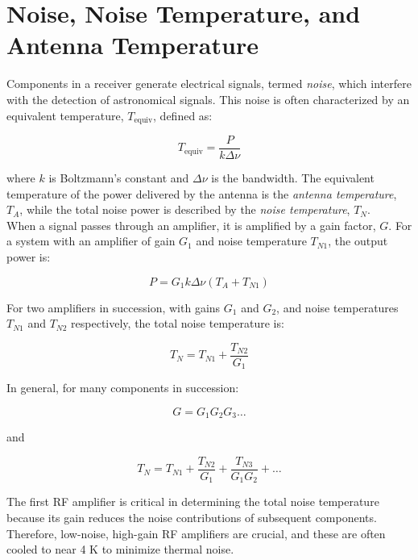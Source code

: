 \section{Noise, Noise Temperature, and Antenna Temperature}

Components in a receiver generate electrical signals, termed \textit{noise}, which interfere with the detection of astronomical signals. This noise is often characterized by an equivalent temperature, $T_{\text{equiv}}$, defined as:

\begin{equation}
    T_{\text{equiv}} = \frac{P}{k \Delta \nu}
\end{equation}

where $k$ is Boltzmann's constant and $\Delta \nu$ is the bandwidth. The equivalent temperature of the power delivered by the antenna is the \textit{antenna temperature}, $T_A$, while the total noise power is described by the \textit{noise temperature}, $T_N$. \\

When a signal passes through an amplifier, it is amplified by a gain factor, $G$. For a system with an amplifier of gain $G_1$ and noise temperature $T_{N1}$, the output power is:

\begin{equation}
    P = G_1 k \Delta \nu (T_A + T_{N1})
\end{equation}

For two amplifiers in succession, with gains $G_1$ and $G_2$, and noise temperatures $T_{N1}$ and $T_{N2}$ respectively, the total noise temperature is:

\begin{equation}
    T_N = T_{N1} + \frac{T_{N2}}{G_1}
\end{equation}

In general, for many components in succession:

\begin{equation}
    G = G_1 G_2 G_3 \ldots
\end{equation}

and

\begin{equation}
    T_N = T_{N1} + \frac{T_{N2}}{G_1} + \frac{T_{N3}}{G_1 G_2} + \ldots
\end{equation}

The first RF amplifier is critical in determining the total noise temperature because its gain reduces the noise contributions of subsequent components. Therefore, low-noise, high-gain RF amplifiers are crucial, and these are often cooled to near 4 K to minimize thermal noise. \\